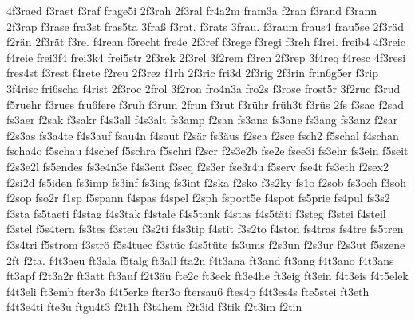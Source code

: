 {    4f3raed
    f3raet
    f3raf
    frage5i
    2f3rah
    2f3ral
    fr4a2m
    fram3a
    f2ran
    f3rand
    f3rann
    2f3rap
    f3rase
    fra3st
    fras5ta
    3fraß
    f3rat.
    f3rats
    3frau.
    f3raum
    fraus4
    frau5se
    2f3räd
    f2rän
    2f3rät
    f3re.
    f4rean
    f5recht
    fre4e
    2f3ref
    f3rege
    f3regi
    f3reh
    f4rei.
    freib4
    4f3reic
    f4reie
    frei3f4
    frei3k4
    frei5str
    2f3rek
    2f3rel
    3f2rem
    f3ren
    2f3rep
    3f4req
    f4resc
    4f3resi
    fres4st
    f3rest
    f4rete
    f2reu
    2f3rez
    f1rh
    2f3ric
    fri3d
    2f3rig
    2f3rin
    frin6g5er
    f3rip
    3f4risc
    fri6scha
    f4rist
    2f3roc
    2frol
    3f2ron
    fro4n3a
    fro2s
    f3rose
    frost5r
    3f2ruc
    f3rud
    f5ruehr
    f3rues
    fru6fere
    f3ruh
    f3rum
    2frun
    f3rut
    f3rühr
    früh3t
    f3rüs
    2fs
    f3sac
    f2sad
    fs3aer
    f2sak
    f3sakr
    f4s3all
    f4s3alt
    fs3amp
    f2san
    fs3ana
    fs3ane
    fs3ang
    fs3anz
    f2sar
    f2s3as
    fs3a4te
    f4s3auf
    fsau4n
    f4saut
    f2sär
    fs3äus
    f2sca
    f2sce
    fsch2
    f5schal
    f4schan
    fscha4o
    f5schau
    f4schef
    f5schra
    f5schri
    f2scr
    f2s3e2b
    fse2e
    fsee3i
    fs3ehr
    fs3ein
    f5seit
    f2s3e2l
    fs5endes
    fs3e4n3e
    f4s3ent
    f3seq
    f2s3er
    fse3r4u
    f5serv
    fse4t
    fs3eth
    f2sex2
    f2si2d
    fs5iden
    fs3imp
    fs3inf
    fs3ing
    fs3int
    f2ska
    f2sko
    f3s2ky
    fs1o
    f2sob
    fs3och
    f3soh
    f2sop
    fso2r
    f1sp
    f5spann
    f4spas
    f4spel
    f2sph
    fsport5e
    f4spot
    fs5prie
    fs4pul
    fs3s2
    f3sta
    fs5taeti
    f4stag
    f4s3tak
    f4stale
    f4s5tank
    f4stas
    f4s5täti
    f3steg
    f3stei
    f4steil
    f3stel
    f5s4tern
    fs3tes
    f3steu
    f3s2ti
    f4s3tip
    f4stit
    f3s2to
    f4ston
    fs4tras
    fs4tre
    fs5tren
    f3s4tri
    f5strom
    f3strö
    f5s4tuec
    f3stüc
    f4s5tüte
    fs3ums
    f2s3un
    f2s3ur
    f2s3ut
    f5szene
    2ft
    f2ta.
    f4t3aeu
    ft3ala
    f5talg
    ft3all
    fta2n
    f4t3ana
    ft3and
    ft3ang
    f4t3ano
    f4t3ans
    ft3apf
    f2t3a2r
    ft3att
    ft3auf
    f2t3äu
    fte2c
    ft3eck
    ft3e4he
    ft3eig
    ft3ein
    f4t3eis
    f4t5elek
    f4t3eli
    ft3emb
    fter3a
    f4t5erke
    fter3o
    ftersau6
    ftes4p
    f4t3es4s
    fte5stei
    ft3eth
    f4t3e4ti
    fte3u
    ftgu4t3
    f2t1h
    f3t4hem
    f2t3id
    f3tik
    f2t3im
    f2tin
}
